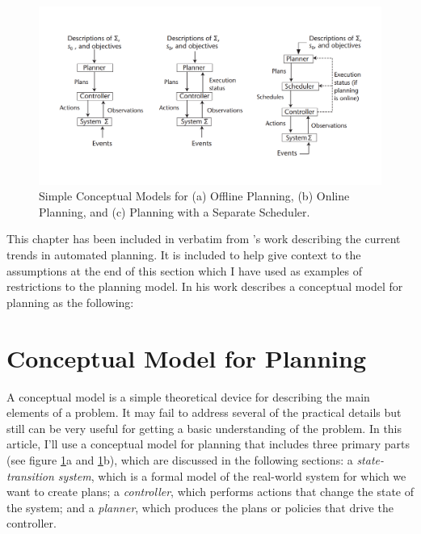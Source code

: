 \begin{figure}
  \centering
  \includegraphics[width=1\linewidth]{figures/planner-diagram.png}
  \caption{Simple Conceptual Models for (a) Offline Planning, (b) Online
    Planning, and (c) Planning with a Separate Scheduler.}
  \label{fig:planner-diagram}
\end{figure}

\newenvironment{sspara}
  {\begin{quote}
    \sffamily
  }
  {
    \normalfont
   \end{quote}
  }

This chapter has been included in verbatim from \cite{Nau2007}'s work describing
the current trends in automated planning. It is included to help give context to
the assumptions at the end of this section which I have used as examples of
restrictions to the planning model. In his work \cite{Nau2007} describes a
conceptual model for planning as the following:

\section{Conceptual Model for Planning}
A conceptual model is a simple theoretical device for describing the main
elements of a problem. It may fail to address several of the practical details
but still can be very useful for getting a basic understanding of the problem.
In this article, I'll use a conceptual model for planning that includes three
primary parts (see figure \ref{fig:planner-diagram}a and
\ref{fig:planner-diagram}b), which are discussed in the following sections: a
\textit{state-transition system}, which is a formal model of the real-world
system for which we want to create plans; a \textit{controller}, which performs
actions that change the state of the system; and a \textit{planner}, which
produces the plans or policies that drive the controller.

